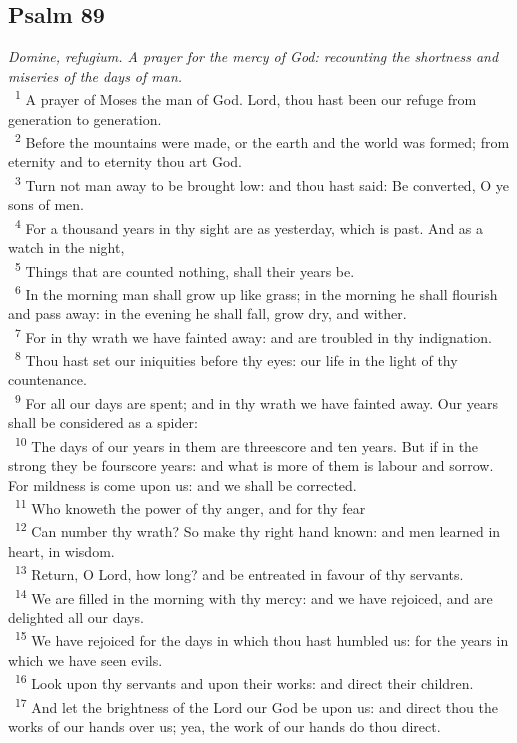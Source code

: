 \documentclass[a5paper,12pt]{article}
\begin{document}
\begin{multicols*}{2}
\section{Psalm 89}
\label{sec:org88508a6}
\emph{Domine, refugium. A prayer for the mercy of God: recounting the shortness and miseries of the days of man.}\\

~\textsuperscript{1} A prayer of Moses the man of God. Lord, thou hast been our refuge from generation to generation.\\
~\textsuperscript{2} Before the mountains were made, or the earth and the world was formed; from eternity and to eternity thou art God.\\
~\textsuperscript{3} Turn not man away to be brought low: and thou hast said: Be converted, O ye sons of men.\\
~\textsuperscript{4} For a thousand years in thy sight are as yesterday, which is past. And as a watch in the night,\\
~\textsuperscript{5} Things that are counted nothing, shall their years be.\\
~\textsuperscript{6} In the morning man shall grow up like grass; in the morning he shall flourish and pass away: in the evening he shall fall, grow dry, and wither.\\
~\textsuperscript{7} For in thy wrath we have fainted away: and are troubled in thy indignation.\\
~\textsuperscript{8} Thou hast set our iniquities before thy eyes: our life in the light of thy countenance.\\
~\textsuperscript{9} For all our days are spent; and in thy wrath we have fainted away. Our years shall be considered as a spider:\\
~\textsuperscript{10} The days of our years in them are threescore and ten years. But if in the strong they be fourscore years: and what is more of them is labour and sorrow. For mildness is come upon us: and we shall be corrected.\\
~\textsuperscript{11} Who knoweth the power of thy anger, and for thy fear\\
~\textsuperscript{12} Can number thy wrath? So make thy right hand known: and men learned in heart, in wisdom.\\
~\textsuperscript{13} Return, O Lord, how long? and be entreated in favour of thy servants.\\
~\textsuperscript{14} We are filled in the morning with thy mercy: and we have rejoiced, and are delighted all our days.\\
~\textsuperscript{15} We have rejoiced for the days in which thou hast humbled us: for the years in which we have seen evils.\\
~\textsuperscript{16} Look upon thy servants and upon their works: and direct their children.\\
~\textsuperscript{17} And let the brightness of the Lord our God be upon us: and direct thou the works of our hands over us; yea, the work of our hands do thou direct.\\


\end{multicols*}
\end{document}
